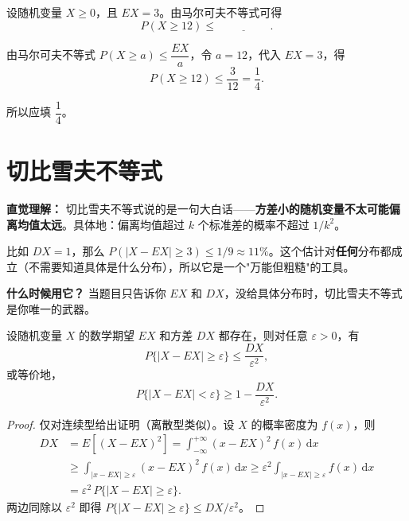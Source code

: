 ﻿\documentclass[lang=cn,11pt]{elegantbook}
\begin{document}
\begin{exercise}\label{exer:5-markov-basic}
设随机变量 \(X\ge 0\)，且 \(EX=3\)。由马尔可夫不等式可得
\[
P(X\ge 12)\le \underline{\hspace{2cm}}.
\]
\end{exercise}
\begin{solution}
由马尔可夫不等式 \(P(X\ge a)\le \dfrac{EX}{a}\)，令 \(a=12\)，代入 \(EX=3\)，得
\[
P(X\ge 12)\le \frac{3}{12}=\frac14.
\]

所以应填 \(\dfrac14\)。
\end{solution}


\section{切比雪夫不等式}

\begin{note}
\textbf{直觉理解：} 切比雪夫不等式说的是一句大白话——\textbf{方差小的随机变量不太可能偏离均值太远}。具体地：偏离均值超过 $k$ 个标准差的概率不超过 $1/k^2$。

比如 $DX=1$，那么 $P(|X-EX|\geqslant 3) \leqslant 1/9 \approx 11\%$。这个估计对\textbf{任何}分布都成立（不需要知道具体是什么分布），所以它是一个"万能但粗糙"的工具。

\textbf{什么时候用它？} 当题目只告诉你 $EX$ 和 $DX$，没给具体分布时，切比雪夫不等式是你唯一的武器。
\end{note}

\begin{theorem}[切比雪夫不等式] \label{thm:chebyshev}
设随机变量 \(X\) 的数学期望 \(EX\) 和方差 \(DX\) 都存在，则对任意 \(\varepsilon > 0\)，有
\[
P\{|X - EX| \geqslant \varepsilon\} \leqslant \frac{DX}{\varepsilon^2},
\]
或等价地，
\[
P\{|X - EX| < \varepsilon\} \geqslant 1 - \frac{DX}{\varepsilon^2}.
\]
\end{theorem}
\begin{proof}
仅对连续型给出证明（离散型类似）。设 \(X\) 的概率密度为 \(f(x)\)，则
\begin{align*}
DX &= E[(X-EX)^2] = \int_{-\infty}^{+\infty}(x-EX)^2\,f(x)\,\mathrm{d}x \\
&\geqslant \int_{|x-EX|\geqslant\varepsilon}(x-EX)^2\,f(x)\,\mathrm{d}x
\geqslant \varepsilon^2 \int_{|x-EX|\geqslant\varepsilon}f(x)\,\mathrm{d}x \\
&= \varepsilon^2\,P\{|X-EX| \geqslant \varepsilon\}.
\end{align*}
两边同除以 \(\varepsilon^2\) 即得 \(P\{|X-EX| \geqslant \varepsilon\} \leqslant DX/\varepsilon^2\)。
\end{proof}
\end{document}
